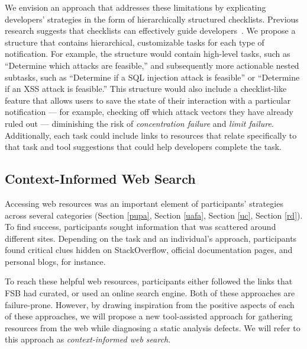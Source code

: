 \documentclass[10pt,journal,compsoc]{IEEEtran}
\begin{document}
We envision an approach that addresses these limitations by explicating developers' strategies in the form of hierarchically structured checklists.
Previous research suggests that checklists can effectively guide developers~\cite{phang2009triaging}.
We propose a structure that contains hierarchical, customizable tasks for each type of notification.
For example, the structure would contain high-level tasks, such as ``Determine which attacks are feasible,'' and subsequently more actionable nested subtasks, such as ``Determine if a SQL injection attack is feasible'' or ``Determine if an XSS attack is feasible.''
This structure would also include a checklist-like feature that allows users to save the state of their interaction with a particular notification --- for example, checking off which attack vectors they have already ruled out --- diminishing the risk of \emph{concentration failure} and \emph{limit failure}.
Additionally, each task could include links to resources that relate specifically to that task and tool suggestions that could help developers complete the task.

\subsection{Context-Informed Web Search}
Accessing web resources was an important element of participants' strategies across several categories (Section \ref{pupa}, Section \ref{uafa}, Section \ref{uc}, Section \ref{rd}).
To find success, participants sought information that was scattered around different sites.
Depending on the task and an individual's approach, participants found critical clues hidden on StackOverflow, official documentation pages, and personal blogs, for instance. 

To reach these helpful web resources, participants either followed the links that FSB had curated, or used an online search engine. 
Both of these approaches are failure-prone.
However, by drawing inspiration from the positive aspects of each of these approaches, we will propose a new tool-assisted approach for gathering resources from the web while diagnosing a static analysis defects. 
We will refer to this approach as \textit{context-informed web search}.
\end{document}
